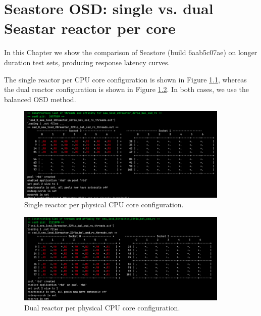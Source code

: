 \graphicspath{ {../figures/} }

\chapter{Seastore OSD: single vs. dual Seastar reactor per core}

In this Chapter we show the comparison of Seastore (build 6aab5c07ae) on longer
duration test sets, producing response latency curves. 

The single reactor per CPU core configuration is shown in Figure
\ref{figure:sea_1osd_single_reactor_conf}, whereas the dual reactor
configuration is shown in Figure \ref{figure:sea_1osd_dual_reactor_conf}.
In both cases, we use the balanced OSD method.

\begin{figure}[!ht]
  \centering
  \includegraphics[width=0.9\textwidth]{sea_1osd_single_reactor_conf.png}
  \caption{Single reactor per physical CPU core configuration.}
  \label{figure:sea_1osd_single_reactor_conf}
\end{figure}


\begin{figure}[!ht]
  \centering
  \includegraphics[width=0.9\textwidth]{sea_1osd_dual_reactor_conf.png}
  \caption{Dual reactor per physical CPU core configuration.}
  \label{figure:sea_1osd_dual_reactor_conf}
\end{figure}


